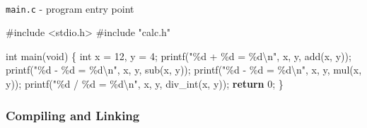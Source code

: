 \documentclass[
  letterpaper,
  DIV=11,
  numbers=noendperiod]{scrreprt}
\makeatletter
\let\oldparagraph\paragraph
\renewcommand{\paragraph}{
    \@ifstar
      \xxxParagraphStar
      \xxxParagraphNoStar
  }
\newcommand{\xxxParagraphStar}[1]{\oldparagraph*{#1}\mbox{}}
\newcommand{\xxxParagraphNoStar}[1]{\oldparagraph{#1}\mbox{}}
\newenvironment{Shaded}{\begin{snugshade}}{\end{snugshade}}
\newcommand{\ControlFlowTok}[1]{\textcolor[rgb]{0.00,0.23,0.31}{\textbf{#1}}}
\newcommand{\DataTypeTok}[1]{\textcolor[rgb]{0.68,0.00,0.00}{#1}}
\newcommand{\DecValTok}[1]{\textcolor[rgb]{0.68,0.00,0.00}{#1}}
\newcommand{\ImportTok}[1]{\textcolor[rgb]{0.00,0.46,0.62}{#1}}
\newcommand{\NormalTok}[1]{\textcolor[rgb]{0.00,0.23,0.31}{#1}}
\newcommand{\OperatorTok}[1]{\textcolor[rgb]{0.37,0.37,0.37}{#1}}
\newcommand{\PreprocessorTok}[1]{\textcolor[rgb]{0.68,0.00,0.00}{#1}}
\newcommand{\SpecialCharTok}[1]{\textcolor[rgb]{0.37,0.37,0.37}{#1}}
\newcommand{\StringTok}[1]{\textcolor[rgb]{0.13,0.47,0.30}{#1}}
\makeatother
\begin{document}
\paragraph{\texorpdfstring{\texttt{main.c} - program entry
point}{main.c - program entry point}}\label{main.c---program-entry-point}

\begin{Shaded}
\begin{Highlighting}[]
\PreprocessorTok{\#include }\ImportTok{\textless{}stdio.h\textgreater{}}
\PreprocessorTok{\#include }\ImportTok{"calc.h"}

\DataTypeTok{int}\NormalTok{ main}\OperatorTok{(}\DataTypeTok{void}\OperatorTok{)} \OperatorTok{\{}
    \DataTypeTok{int}\NormalTok{ x }\OperatorTok{=} \DecValTok{12}\OperatorTok{,}\NormalTok{ y }\OperatorTok{=} \DecValTok{4}\OperatorTok{;}
\NormalTok{    printf}\OperatorTok{(}\StringTok{"}\SpecialCharTok{\%d}\StringTok{ + }\SpecialCharTok{\%d}\StringTok{ = }\SpecialCharTok{\%d\textbackslash{}n}\StringTok{"}\OperatorTok{,}\NormalTok{ x}\OperatorTok{,}\NormalTok{ y}\OperatorTok{,}\NormalTok{ add}\OperatorTok{(}\NormalTok{x}\OperatorTok{,}\NormalTok{ y}\OperatorTok{));}
\NormalTok{    printf}\OperatorTok{(}\StringTok{"}\SpecialCharTok{\%d}\StringTok{ {-} }\SpecialCharTok{\%d}\StringTok{ = }\SpecialCharTok{\%d\textbackslash{}n}\StringTok{"}\OperatorTok{,}\NormalTok{ x}\OperatorTok{,}\NormalTok{ y}\OperatorTok{,}\NormalTok{ sub}\OperatorTok{(}\NormalTok{x}\OperatorTok{,}\NormalTok{ y}\OperatorTok{));}
\NormalTok{    printf}\OperatorTok{(}\StringTok{"}\SpecialCharTok{\%d}\StringTok{ {-} }\SpecialCharTok{\%d}\StringTok{ = }\SpecialCharTok{\%d\textbackslash{}n}\StringTok{"}\OperatorTok{,}\NormalTok{ x}\OperatorTok{,}\NormalTok{ y}\OperatorTok{,}\NormalTok{ mul}\OperatorTok{(}\NormalTok{x}\OperatorTok{,}\NormalTok{ y}\OperatorTok{));}
\NormalTok{    printf}\OperatorTok{(}\StringTok{"}\SpecialCharTok{\%d}\StringTok{ / }\SpecialCharTok{\%d}\StringTok{ = }\SpecialCharTok{\%d\textbackslash{}n}\StringTok{"}\OperatorTok{,}\NormalTok{ x}\OperatorTok{,}\NormalTok{ y}\OperatorTok{,}\NormalTok{ div\_int}\OperatorTok{(}\NormalTok{x}\OperatorTok{,}\NormalTok{ y}\OperatorTok{));}
    \ControlFlowTok{return} \DecValTok{0}\OperatorTok{;}
\OperatorTok{\}}
\end{Highlighting}
\end{Shaded}

\subsubsection{Compiling and Linking}\label{compiling-and-linking}
\end{document}
